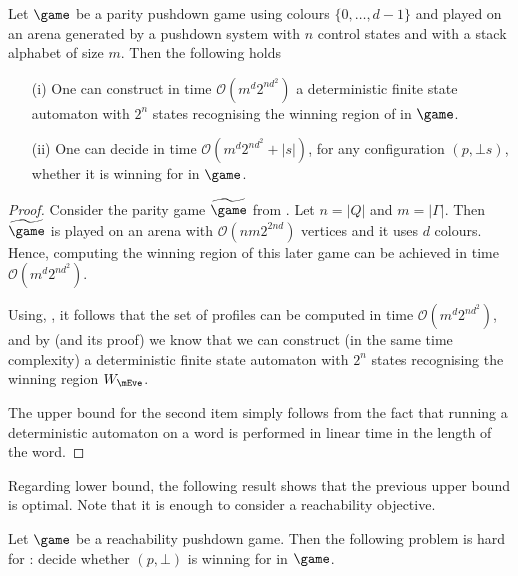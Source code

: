 \begin{theorem}\label{11-thm:solving-upper-bound}
	Let $\game$ be a parity pushdown game using colours $\{0,\dots,d-1\}$ and played on an arena generated by a pushdown system with $n$ control states and with a stack alphabet of size $m$. Then the following holds
	\begin{enumerate}
		\item[(i)] One can construct in time $\mathcal{O}(m^d 2^{nd^2})$ a deterministic finite state automaton with $2^n$ states recognising the winning region of \Eve in $\game$.
		\item[(ii)] One can decide in time $\mathcal{O}(m^d 2^{nd^2}+|s|)$, for any configuration $(p,\bot s)$, whether it is winning for \Eve in $\game$. 
	\end{enumerate}
\end{theorem}


\begin{proof}
	Consider the parity game $\fgame$ from . Let $n=|Q|$ and $m=|\Gamma|$. Then $\fgame$ is played on an arena with $\mathcal{O}(n m 2^{2nd})$ vertices and it uses $d$ colours. Hence, computing the winning region of this later game can be achieved in time $\mathcal{O}(m^d 2^{nd^2})$.
	
	Using, , it follows that the set of profiles can be computed in time $\mathcal{O}(m^d 2^{nd^2})$, and by  (and its proof) we know that we can construct (in the same time complexity) a deterministic finite state automaton with $2^n$ states recognising the winning region $W_\mEve$.
	
	The upper bound for the second item simply follows from the fact that running a deterministic automaton on a word is performed in linear time in the length of the word.
\end{proof}

Regarding lower bound, the following result shows that the previous upper bound is optimal. Note that it is enough to consider a reachability objective.

\begin{theorem}\label{11-thm:solving-lower-bound}
	Let $\game$ be a reachability pushdown game. Then the following problem is hard for \EXP: decide whether $(p,\bot)$ is winning for \Eve in $\game$.
\end{theorem}

